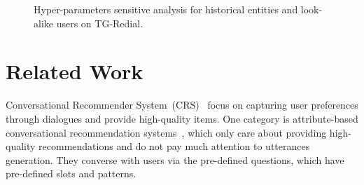\documentclass[sigconf,natbib=true]{acmart}
\begin{document}
\begin{figure}[htbp]
\vspace{-2mm}
\centering
{}\vspace{-2mm}
\caption{Hyper-parameters sensitive analysis for historical entities and look-alike users on TG-Redial.}
\vspace{-2mm}
\label{para_sensi}
\end{figure}















\section{Related Work}

Conversational Recommender System~(CRS)~\cite{chen2019towards,lesi2020interactive,xu2021adapting} focus on capturing user preferences through dialogues and provide high-quality items. One category is attribute-based conversational recommendation systems~\cite{christakopoulou2016towards,xu2021adapting,sun2018conversational,li2021seamlessly,zhou2020leveraging,fu2021hoops,ren2021learning,xie2021comparison}, which only care about providing high-quality recommendations and do not pay much attention to utterances generation. They converse with users via the pre-defined questions, which have pre-defined slots and patterns. 
\end{document}
